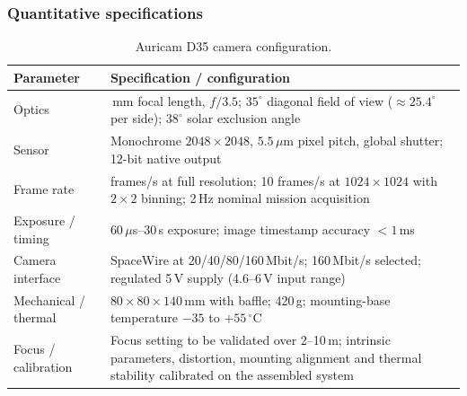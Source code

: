 \documentclass[11pt,a4paper]{article}
\renewcommand{\arraystretch}{1.3}
\begin{document}
\subsubsection{Quantitative specifications}
\begin{table}[H]
\centering\small
\renewcommand{\arraystretch}{1.45}
\setlength{\tabcolsep}{6pt}
\caption{Auricam D35 camera configuration.}
\label{tab:ml_cv_camera}
\begin{tabularx}{\linewidth}{|>{\raggedright\arraybackslash}p{3.6cm}|>{\raggedright\arraybackslash}X|}
\hline
\rowcolor{black!8}
\textbf{Parameter} & \textbf{Specification / configuration} \\
\hline
Optics & 25\,mm focal length, $f/3.5$; $35^{\circ}$ diagonal field of view ($\approx25.4^{\circ}$ per side); $38^{\circ}$ solar exclusion angle \\
\hline
Sensor & Monochrome $2048\times2048$, $5.5\,\mu$m pixel pitch, global shutter; 12-bit native output \\
\hline
Frame rate & 2.5 frames/s at full resolution; 10 frames/s at $1024\times1024$ with $2\times2$ binning; 2\,Hz nominal mission acquisition \\
\hline
Exposure / timing & $60\,\mu$s--30\,s exposure; image timestamp accuracy $<1$\,ms \\
\hline
Camera interface & SpaceWire at 20/40/80/160\,Mbit/s; 160\,Mbit/s selected; regulated 5\,V supply (4.6--6\,V input range) \\
\hline
Mechanical / thermal & $80\times80\times140$\,mm with baffle; 420\,g; mounting-base temperature $-35$ to $+55\,^{\circ}$C \\
\hline
Focus / calibration & Focus setting to be validated over 2--10\,m; intrinsic parameters, distortion, mounting alignment and thermal stability calibrated on the assembled system \\
\hline
\end{tabularx}
\end{table}
\end{document}
